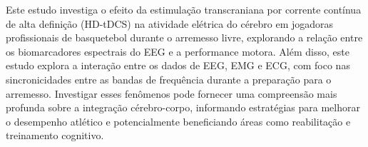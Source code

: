 Este estudo investiga o efeito da estimulação transcraniana por corrente contínua de alta definição (HD-tDCS) na atividade elétrica do cérebro em jogadoras profissionais de basquetebol durante o arremesso livre, explorando a relação entre os biomarcadores espectrais do EEG e a performance motora. Além disso, este estudo explora a interação entre os dados de EEG, EMG e ECG, com foco nas sincronicidades entre as bandas de frequência durante a preparação para o arremesso. Investigar esses fenômenos pode fornecer uma compreensão mais profunda sobre a integração cérebro-corpo, informando estratégias para melhorar o desempenho atlético e potencialmente beneficiando áreas como reabilitação e treinamento cognitivo.